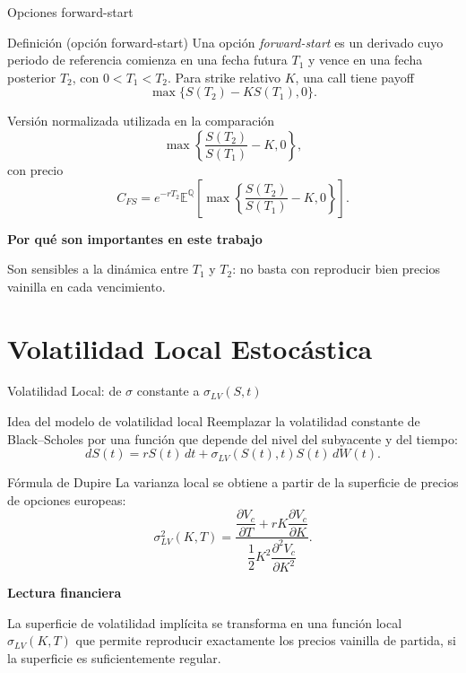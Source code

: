 \documentclass[8pt]{beamer}
\begin{document}
\begin{frame}{Opciones forward-start}
    \begin{block}{Definición (opción forward-start)}
        Una opción \textit{forward-start} es un derivado cuyo periodo de referencia comienza en una fecha futura $T_1$ y vence en una fecha posterior $T_2$, con $0<T_1<T_2$. Para strike relativo $K$, una call tiene payoff
        \[
            \max\{S(T_2)-K S(T_1),0\}.
        \]
    \end{block}
    \pause

    \begin{block}{Versión normalizada utilizada en la comparación}
        \[
            \max\left\{\frac{S(T_2)}{S(T_1)}-K,0\right\},
        \]
        con precio
        \[
            C_{FS}=e^{-rT_2}
            \mathbb{E}^{\mathbb Q}\left[
            \max\left\{\frac{S(T_2)}{S(T_1)}-K,0\right\}
            \right].
        \]
    \end{block}
    \pause

    \textbf{Por qué son importantes en este trabajo}

Son sensibles a la dinámica entre $T_1$ y $T_2$: no basta con reproducir bien precios vainilla en cada vencimiento.

\end{frame}

\section{Volatilidad Local Estocástica}

\begin{frame}{Volatilidad Local: de $\sigma$ constante a $\sigma_{LV}(S,t)$}
\begin{block}{Idea del modelo de volatilidad local}
Reemplazar la volatilidad constante de Black--Scholes por una función que depende del nivel del subyacente y del tiempo:
\[
    dS(t) = rS(t)\,dt + \sigma_{LV}(S(t),t)S(t)\,dW(t).
\]
\end{block}
\pause

\begin{block}{Fórmula de Dupire}
La varianza local se obtiene a partir de la superficie de precios de opciones europeas:
\[
    \sigma_{LV}^2(K,T) =
    \frac{\dfrac{\partial V_c}{\partial T} + rK\dfrac{\partial V_c}{\partial K}}
    {\dfrac{1}{2}K^2\dfrac{\partial^2 V_c}{\partial K^2}}.
\]
\end{block}
\pause

\textbf{Lectura financiera}

La superficie de volatilidad implícita se transforma en una función local $\sigma_{LV}(K,T)$ que permite reproducir exactamente los precios vainilla de partida, si la superficie es suficientemente regular.

\end{frame}
\end{document}
